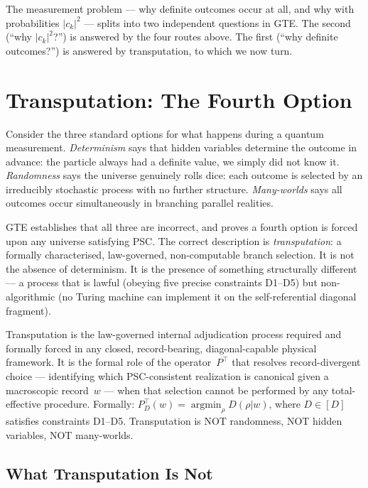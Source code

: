 \documentclass[11pt,openany]{book}
\theoremstyle{remark}
\begin{document}
The measurement problem --- why definite outcomes occur at all, and why with
probabilities $|c_k|^2$ --- splits into two independent questions in GTE.  The second
(``why $|c_k|^2$?'') is answered by the four routes above.  The first (``why
definite outcomes?'') is answered by transputation, to which we now turn.

\section{Transputation: The Fourth Option}
\label{sec:transputation}

Consider the three standard options for what happens during a quantum measurement.
\emph{Determinism} says that hidden variables determine the outcome in advance:
the particle always had a definite value, we simply did not know it.
\emph{Randomness} says the universe genuinely rolls dice: each outcome is selected by
an irreducibly stochastic process with no further structure.
\emph{Many-worlds} says all outcomes occur simultaneously in branching parallel realities.

GTE establishes that all three are incorrect, and proves a fourth option is forced
upon any universe satisfying PSC.  The correct description is \emph{transputation}:
a formally characterised, law-governed, non-computable branch selection.  It is not
the absence of determinism.  It is the presence of something structurally different ---
a process that is lawful (obeying five precise constraints D1--D5) but non-algorithmic
(no Turing machine can implement it on the self-referential diagonal fragment).

\begin{tcolorbox}[colback=green!5,colframe=green!50!black,
  title={Definition: Transputation}]
  Transputation is the law-governed internal adjudication process required and formally
  forced in any closed, record-bearing, diagonal-capable physical framework.  It is the
  formal role of the operator~$P^\top$ that resolves record-divergent choice --- identifying
  which PSC-consistent realization is canonical given a macroscopic record~$w$ --- when
  that selection cannot be performed by any total-effective procedure.
  Formally: $P^\top_D(w) = \operatorname{argmin}_\rho D(\rho|w)$, where $D \in [D]$
  satisfies constraints D1--D5.
  Transputation is NOT randomness, NOT hidden variables, NOT many-worlds.
\end{tcolorbox}

\subsection*{What Transputation Is Not}
\end{document}
